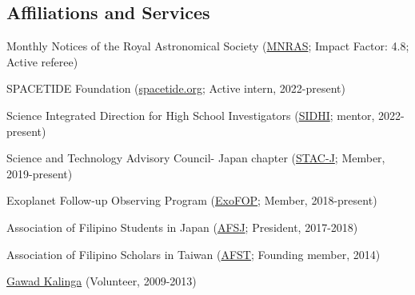 \documentclass[11pt,letterpaper]{article}
\begin{document}
\subsection{Affiliations and Services}
\begin{list}{}{\cvlist}
    \item Monthly Notices of the Royal Astronomical Society (\href{https://academic.oup.com/mnras}{MNRAS}; Impact Factor: 4.8; Active referee)
    \item SPACETIDE Foundation (\href{https://spacetide.jp/en/}{spacetide.org}; Active intern, 2022-present)
    \item Science Integrated Direction for High School Investigators (\href{https://www.sidhi.org/}{SIDHI}; mentor, 2022-present)
    \item Science and Technology Advisory Council- Japan chapter (\href{https://www.facebook.com/profile.php?id=100083271798519}{STAC-J}; Member, 2019-present)
    \item Exoplanet Follow-up Observing Program (\href{https://exofop.ipac.caltech.edu/tess/}{ExoFOP}; Member, 2018-present)
    \item Association of Filipino Students in Japan (\href{https://www.facebook.com/afsjpage}{AFSJ}; President, 2017-2018)
    \item Association of Filipino Scholars in Taiwan (\href{https://www.facebook.com/AssocIskolar}{AFST}; Founding member, 2014)
    \item \href{https://gk1world.com/volunteer}{Gawad Kalinga} (Volunteer, 2009-2013)
\end{list}

\end{document}
